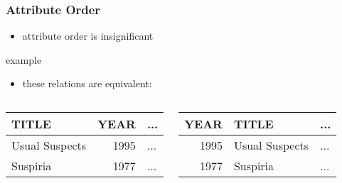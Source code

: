 \documentclass[dvipsnames]{beamer}
\theoremstyle{plain}
\begin{document}
\begin{frame}
  \frametitle{Attribute Order}

  \begin{itemize}
    \item attribute order is insignificant
  \end{itemize}

  \medskip
  \begin{exampleblock}{example}
    \begin{itemize}
      \item these relations are equivalent:
    \end{itemize}

    \begin{columns}
      \begin{footnotesize}
      \begin{table}
        \begin{tabular}{|l|r|l|}\hline
TITLE          & YEAR & ...\\\hline\hline
Usual Suspects & 1995 & ...\\\hline
Suspiria       & 1977 & ...\\\hline
        \end{tabular}
      \end{table}
      \end{footnotesize}

      \begin{footnotesize}
      \begin{table}
        \begin{tabular}{|r|l|l|}\hline
YEAR & TITLE                & ...\\\hline\hline
1995 & Usual Suspects       & ...\\\hline
1977 & Suspiria             & ...\\\hline
        \end{tabular}
      \end{table}
      \end{footnotesize}
    \end{columns}
  \end{exampleblock}
\end{frame}
\end{document}
